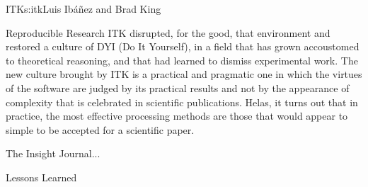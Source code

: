 \begin{aosachapter}{ITK}{s:itk}{Luis Ib\'{a}\~{n}ez and Brad King}
\begin{aosasect1}{Reproducible Research}
ITK disrupted, for the good, that environment and restored a culture
of DYI (Do It Yourself), in a field that has grown accoustomed to
theoretical reasoning, and that had learned to dismiss experimental
work. The new culture brought by ITK is a practical and pragmatic one
in which the virtues of the software are judged by its practical results
and not by the appearance of complexity that is celebrated in scientific
publications. Helas, it turns out that in practice, the most effective
processing methods are those that would appear to simple to be accepted
for a scientific paper.

The Insight Journal...
\end{aosasect1}

\begin{aosasect1}{Lessons Learned}
\end{aosasect1}

\end{aosachapter}
